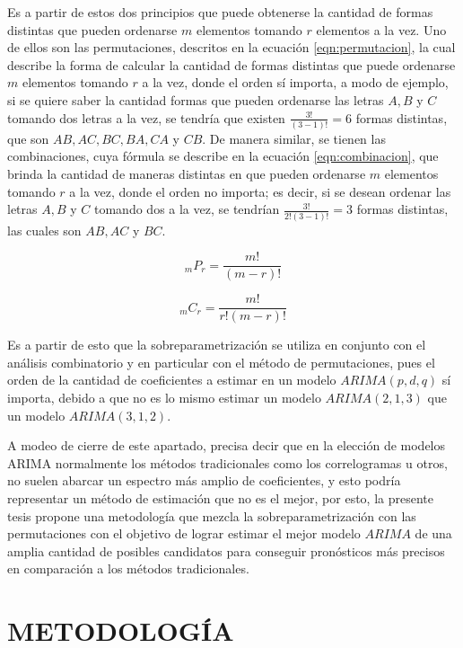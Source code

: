 \documentclass[
]{article}
\begin{document}
Es a partir de estos dos principios que puede obtenerse la cantidad de
formas distintas que pueden ordenarse \(m\) elementos tomando \(r\)
elementos a la vez. Uno de ellos son las permutaciones, descritos en la
ecuación \eqref{eqn:permutacion}, la cual describe la forma de calcular
la cantidad de formas distintas que puede ordenarse \(m\) elementos
tomando \(r\) a la vez, donde el orden sí importa, a modo de ejemplo, si
se quiere saber la cantidad formas que pueden ordenarse las letras
\(A, B\) y \(C\) tomando dos letras a la vez, se tendría que existen
\(\frac{3!}{(3-1)!}=6\) formas distintas, que son \(AB, AC, BC, BA, CA\)
y \(CB\). De manera similar, se tienen las combinaciones, cuya fórmula
se describe en la ecuación \eqref{eqn:combinacion}, que brinda la
cantidad de maneras distintas en que pueden ordenarse \(m\) elementos
tomando \(r\) a la vez, donde el orden no importa; es decir, si se
desean ordenar las letras \(A, B\) y \(C\) tomando dos a la vez, se
tendrían \(\frac{3!}{2!(3-1)!}=3\) formas distintas, las cuales son
\(AB, AC\) y \(BC\).

\begin{equation}
\label{eqn:permutacion}
_mP_r=\frac{m!}{(m-r)!}
\end{equation}

\begin{equation}
\label{eqn:combinacion}
_mC_r=\frac{m!}{r!(m-r)!}
\end{equation}

Es a partir de esto que la sobreparametrización se utiliza en conjunto
con el análisis combinatorio y en particular con el método de
permutaciones, pues el orden de la cantidad de coeficientes a estimar en
un modelo \(ARIMA(p,d,q)\) sí importa, debido a que no es lo mismo
estimar un modelo \(ARIMA(2,1,3)\) que un modelo \(ARIMA(3,1,2)\).

A modeo de cierre de este apartado, precisa decir que en la elección de
modelos ARIMA normalmente los métodos tradicionales como los
correlogramas u otros, no suelen abarcar un espectro más amplio de
coeficientes, y esto podría representar un método de estimación que no
es el mejor, por esto, la presente tesis propone una metodología que
mezcla la sobreparametrización con las permutaciones con el objetivo de
lograr estimar el mejor modelo \(ARIMA\) de una amplia cantidad de
posibles candidatos para conseguir pronósticos más precisos en
comparación a los métodos tradicionales.

\newpage

\section{METODOLOGÍA} 
\end{document}
